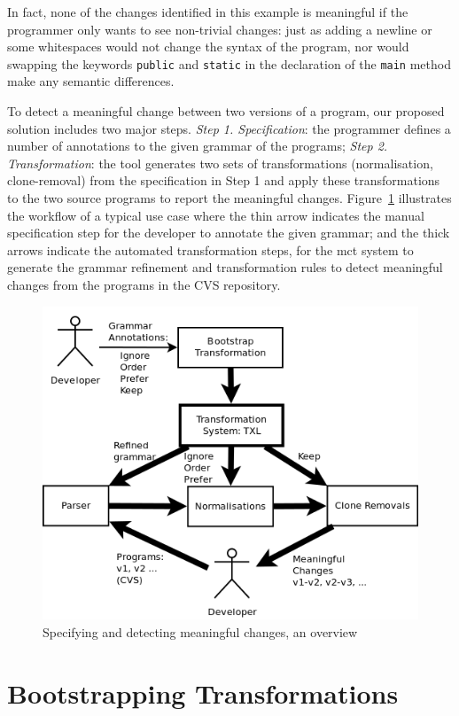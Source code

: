 \documentclass[10pt, conference, compsocconf]{IEEEtran}
\begin{document}
In fact, none of the changes identified in this example is meaningful if the programmer only wants to see non-trivial
changes: just as adding a newline or some whitespaces would not change the syntax of the program, nor would swapping the keywords {\tt public} and {\tt static} in the declaration of the {\tt main} method make any semantic differences.

To detect a meaningful change between two versions of a program, our proposed solution includes two major steps. {\em Step 1. Specification}: the programmer defines a number of annotations to the given grammar of the programs; {\em Step 2. Transformation}: the tool generates two sets of transformations (normalisation, clone-removal) from the specification in Step 1 and apply these transformations to the two source programs to report the meaningful changes. Figure~\ref{fig:overview} illustrates the workflow of a typical use case where the thin arrow indicates the manual specification step for the developer to annotate the given grammar; and the thick arrows indicate the automated transformation steps, for the mct system to generate the grammar refinement and transformation rules to detect meaningful changes from the programs in the CVS repository. 
\begin{figure}\centering
\includegraphics[width=\columnwidth]{code/overview}
\caption{Specifying and detecting meaningful changes, an overview}\label{fig:overview}
\end{figure}

\section{Bootstrapping Transformations}\label{sec:approach}
\end{document}
